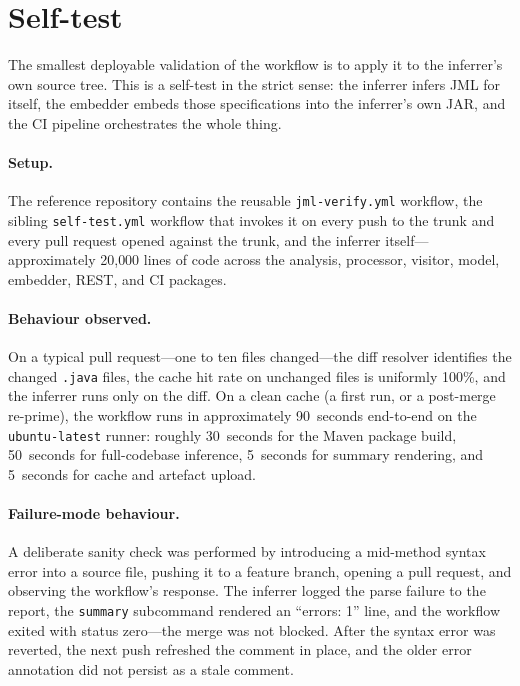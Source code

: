 \section{Self-test}
\label{sec:ci-selftest}

The smallest deployable validation of the workflow is to apply it to the
inferrer's own source tree. This is a self-test in the strict sense: the inferrer
infers JML for itself, the embedder embeds those specifications into the
inferrer's own JAR, and the CI pipeline orchestrates the whole thing.

\paragraph{Setup.} The reference repository contains the reusable
\texttt{jml-verify.yml} workflow, the sibling \texttt{self-test.yml} workflow
that invokes it on every push to the trunk and every pull request opened against
the trunk, and the inferrer itself---approximately 20{,}000 lines of code across
the analysis, processor, visitor, model, embedder, REST, and CI packages.

\paragraph{Behaviour observed.} On a typical pull request---one to ten files
changed---the diff resolver identifies the changed \texttt{.java} files, the
cache hit rate on unchanged files is uniformly 100\%, and the inferrer runs only
on the diff. On a clean cache (a first run, or a post-merge re-prime), the
workflow runs in approximately 90~seconds end-to-end on the
\texttt{ubuntu-latest} runner: roughly 30~seconds for the Maven package build,
50~seconds for full-codebase inference, 5~seconds for summary rendering, and
5~seconds for cache and artefact upload.

\paragraph{Failure-mode behaviour.} A deliberate sanity check was performed by
introducing a mid-method syntax error into a source file, pushing it to a feature
branch, opening a pull request, and observing the workflow's response. The
inferrer logged the parse failure to the report, the \texttt{summary} subcommand
rendered an ``errors: 1'' line, and the workflow exited with status zero---the
merge was not blocked. After the syntax error was reverted, the next push
refreshed the comment in place, and the older error annotation did not persist as
a stale comment.

